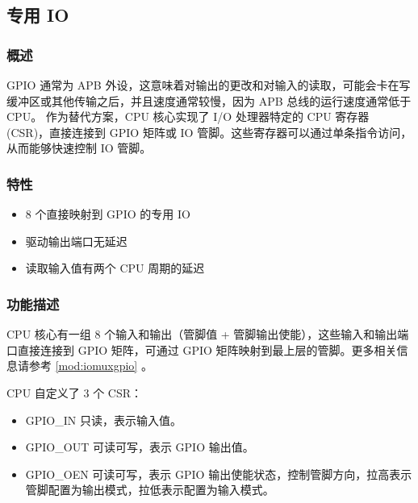 \documentclass[main\_\_CN.tex]{subfiles}
\begin{document}
\newpage
\subsection{专用 IO}
\label{sec:riscvcpu-fastio}
\subsubsection{概述}
\label{sec:riscvcpu-fastio-overview}

GPIO 通常为 APB 外设，这意味着对输出的更改和对输入的读取，可能会卡在写缓冲区或其他传输之后，并且速度通常较慢，因为 APB 总线的运行速度通常低于 CPU。
作为替代方案，CPU 核心实现了 I/O 处理器特定的 CPU 寄存器 (CSR)，直接连接到 GPIO 矩阵或 IO 管脚。这些寄存器可以通过单条指令访问，从而能够快速控制 IO 管脚。

\subsubsection{特性}
\label{sec:riscvcpu-fastio-features}
 \begin{itemize}
    \item 8 个直接映射到 GPIO 的专用 IO
    \item 驱动输出端口无延迟
    \item 读取输入值有两个 CPU 周期的延迟
\end{itemize}

\subsubsection{功能描述}
\label{sec:riscvcpu-fastio-func-descr}

CPU 核心有一组 8 个输入和输出（管脚值 + 管脚输出使能），这些输入和输出端口直接连接到 GPIO 矩阵，可通过 GPIO 矩阵映射到最上层的管脚。更多相关信息请参考 \ref{mod:iomuxgpio} \textit{}。

CPU 自定义了 3 个 CSR：
\begin{itemize}
    \item GPIO\_IN 只读，表示输入值。
    \item GPIO\_OUT 可读可写，表示 GPIO 输出值。
    \item GPIO\_OEN 可读可写，表示 GPIO 输出使能状态，控制管脚方向，拉高表示管脚配置为输出模式，拉低表示配置为输入模式。
\end{itemize}

\end{document}
